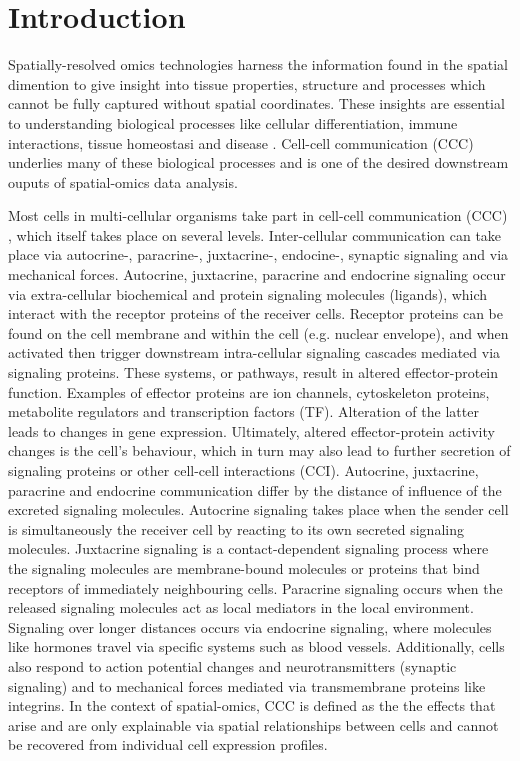 \chapter{Introduction}
\setcounter{page}{1}



Spatially-resolved omics technologies harness the information found in the spatial dimention to give insight into tissue properties, structure and processes which cannot be fully captured without spatial coordinates. These insights are essential to understanding biological processes like cellular differentiation, immune interactions, tissue homeostasi and disease \cite{Armingol-2021} \cite{Jin-2022}. Cell-cell communication (CCC) underlies many of these biological processes and is one of the desired downstream ouputs of spatial-omics data analysis.

Most cells in multi-cellular organisms take part in cell-cell communication (CCC) \cite{Alberts-2015}, which itself takes place on several levels. Inter-cellular communication can take place via autocrine-, paracrine-, juxtacrine-, endocine-, synaptic signaling and via mechanical forces. Autocrine, juxtacrine, paracrine and endocrine signaling occur via extra-cellular biochemical and protein signaling molecules (ligands), which interact with the receptor proteins of the receiver cells. Receptor proteins can be found on the cell membrane and within the cell (e.g. nuclear envelope), and when activated then trigger downstream intra-cellular signaling cascades mediated via signaling proteins. These systems, or pathways, result in altered effector-protein function. Examples of effector proteins are ion channels, cytoskeleton proteins, metabolite regulators and transcription factors (TF). Alteration of the latter leads to changes in gene expression. Ultimately, altered effector-protein activity changes is the cell's behaviour, which in turn may also lead to further secretion of signaling proteins or other cell-cell interactions (CCI). Autocrine, juxtacrine, paracrine and endocrine communication differ by the distance of influence of the excreted signaling molecules. Autocrine signaling takes place when the sender cell is simultaneously the receiver cell by reacting to its own secreted signaling molecules. Juxtacrine signaling is a contact-dependent signaling process where the signaling molecules are membrane-bound molecules or proteins that bind receptors of immediately neighbouring cells. Paracrine signaling occurs when the released signaling molecules act as local mediators in the local environment. Signaling over longer distances occurs via endocrine signaling, where molecules like hormones travel via specific systems such as blood vessels. Additionally, cells also respond to action potential changes and neurotransmitters (synaptic signaling) and to mechanical forces mediated via transmembrane proteins like integrins. In the context of spatial-omics, CCC is defined as the the effects that arise and are only explainable via spatial relationships between cells and cannot be recovered from individual cell expression profiles.

